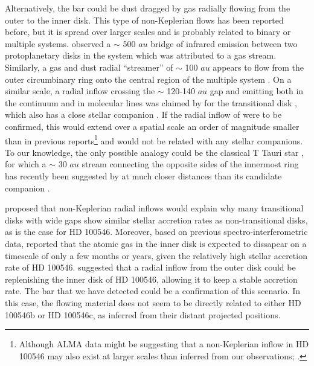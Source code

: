 \documentclass{aa}
\begin{document}
Alternatively, the bar could be dust dragged by gas radially flowing from the outer to the inner disk. This type of non-Keplerian flows has been reported before, but it is spread over larger scales and is probably related to binary or multiple systems. \citet{Mayama10} observed a $\sim$ 500 $au$ bridge of infrared emission between two protoplanetary disks in the system  which was attributed to a gas stream. Similarly, a gas and dust radial ``streamer'' of $\sim$ 100 $au$ appears to flow from the outer circumbinary ring onto the central region of the multiple system  \citep{Pietu11,Beck12}. On a similar scale, a radial inflow crossing the $\sim$ 120-140 $au$ gap and emitting both in the continuum and in molecular lines was claimed by \citet{Casassus13} for the transitional disk , which also has a close stellar companion \citep{Biller12,Close14,Lacour16}. If the radial inflow of  were to be confirmed, this would extend over a spatial scale an order of magnitude smaller than in previous reports\footnote{Although ALMA data might be suggesting that a non-Keplerian inflow in HD 100546 may also exist at larger scales than inferred from our observations; \citet{Walsh17}.} and would not be related with any stellar companions. To our knowledge, the only possible analogy could be the classical T Tauri star , for which a $\sim$ 30 $au$ stream connecting the opposite sides of the innermost ring has recently been suggested by \citet{Loomis17} at much closer distances than its candidate companion \citep{Itoh08}.

\citet{Rosenfeld14} proposed that non-Keplerian radial inflows would explain why many transitional disks with wide gaps show similar stellar accretion rates as non-transitional disks, as is the case for HD 100546. Moreover, based on previous spectro-interferometric data, \citet{Mendi15b} reported that the atomic gas in the inner disk is expected to dissapear on a timescale of only a few months
or years, given the relatively high stellar accretion rate of HD 100546. \citet{Mendi15b} suggested that a radial inflow from the outer disk could be replenishing the inner disk of HD 100546, allowing it to keep a stable accretion rate. The bar that we have detected could be a confirmation of this scenario. In this case, the flowing material does not seem to be directly related to either HD 100546b or HD 100546c, as inferred from their distant projected positions. 
\end{document}
